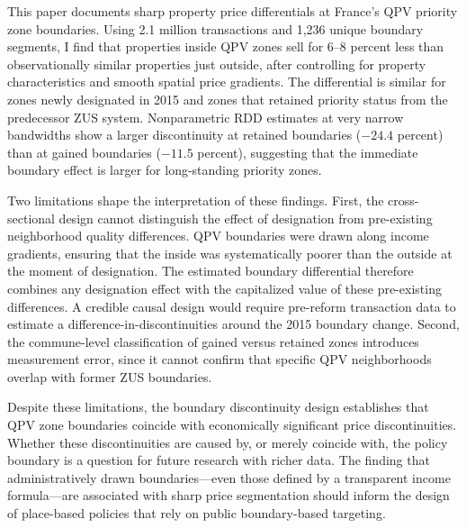\documentclass[12pt]{article}
\begin{document}
This paper documents sharp property price differentials at France's QPV priority zone boundaries. Using 2.1 million transactions and 1,236 unique boundary segments, I find that properties inside QPV zones sell for 6--8 percent less than observationally similar properties just outside, after controlling for property characteristics and smooth spatial price gradients. The differential is similar for zones newly designated in 2015 and zones that retained priority status from the predecessor ZUS system. Nonparametric RDD estimates at very narrow bandwidths show a larger discontinuity at retained boundaries ($-24.4$ percent) than at gained boundaries ($-11.5$ percent), suggesting that the immediate boundary effect is larger for long-standing priority zones.

Two limitations shape the interpretation of these findings. First, the cross-sectional design cannot distinguish the effect of designation from pre-existing neighborhood quality differences. QPV boundaries were drawn along income gradients, ensuring that the inside was systematically poorer than the outside at the moment of designation. The estimated boundary differential therefore combines any designation effect with the capitalized value of these pre-existing differences. A credible causal design would require pre-reform transaction data to estimate a difference-in-discontinuities around the 2015 boundary change. Second, the commune-level classification of gained versus retained zones introduces measurement error, since it cannot confirm that specific QPV neighborhoods overlap with former ZUS boundaries.

Despite these limitations, the boundary discontinuity design establishes that QPV zone boundaries coincide with economically significant price discontinuities. Whether these discontinuities are caused by, or merely coincide with, the policy boundary is a question for future research with richer data. The finding that administratively drawn boundaries---even those defined by a transparent income formula---are associated with sharp price segmentation should inform the design of place-based policies that rely on public boundary-based targeting.

\label{apep_main_text_end}



\end{document}
